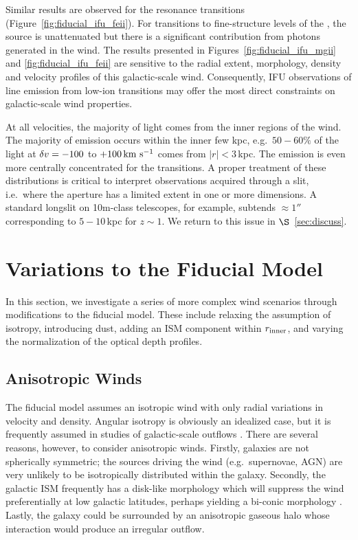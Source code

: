 \documentclass[12pt,preprint]{aastex}
\begin{document}
Similar results are observed for the  resonance
transitions (Figure~\ref{fig:fiducial_ifu_feii}).
For transitions to fine-structure levels of the \aconfig, the source
is unattenuated but there is a significant contribution from photons
generated in the wind. 
The results presented in Figures~\ref{fig:fiducial_ifu_mgii} and
\ref{fig:fiducial_ifu_feii} are sensitive to the radial extent,
morphology, density and velocity profiles of this galactic-scale
wind.  Consequently, IFU observations of line emission from low-ion
transitions may offer the most direct constraints on galactic-scale
wind properties. 

At all velocities, the majority of light comes from the inner regions
of the wind. 
The majority of
 emission occurs within the inner few kpc, e.g.\ $50-60\%$
of the light at $\delta v=-100$ to $+100 \, {\rm km~s^{-1}}$
comes from $|r| < 3$\,kpc.
The emission
is even more centrally concentrated for the  transitions.
A proper treatment of these
distributions is critical to interpret observations
acquired through a slit, i.e.\ where the aperture has a limited extent
in one or more dimensions.  A standard longslit on 10m-class
telescopes, for example, subtends $\approx 1''$ corresponding to
$5-10$\,kpc for $z \sim 1$.    We return to this issue in
$\S$~\ref{sec:discuss}. 


\section{Variations to the Fiducial Model}
\label{sec:variants}

In this section, we investigate a series of more complex wind
scenarios
through modifications to the fiducial model.  These include relaxing
the assumption of isotropy, introducing dust, adding an ISM
component within $r_{\rm inner}$, and varying the normalization of the
optical depth profiles.

\subsection{Anisotropic Winds}
\label{sec:anisotropic}

The fiducial model assumes an
isotropic wind with only radial variations in velocity and density. 
Angular isotropy is obviously an idealized case, but
it is frequently assumed in studies of galactic-scale outflows
\citep[e.g.][]{steidel+10}.   There are several reasons, however, to
consider anisotropic winds.  Firstly, galaxies are not spherically
symmetric;  the sources driving the
wind (e.g.\ supernovae, AGN) are very unlikely to be isotropically distributed
within the galaxy.  
Secondly, the galactic ISM frequently has a disk-like morphology
which will suppress the wind preferentially at low galactic latitudes,
perhaps yielding a bi-conic morphology \citep[e.g.][]{M87}.
Lastly, the galaxy could be surrounded by an
anisotropic gaseous halo whose interaction would produce an irregular 
outflow.
\end{document}
